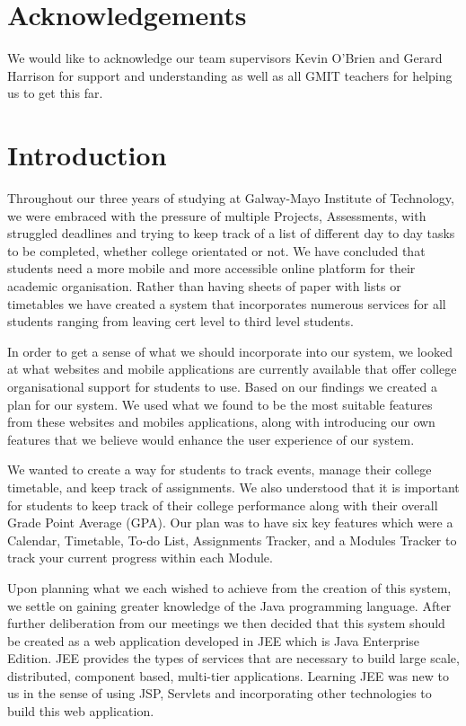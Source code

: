 \chapter*{Acknowledgements}
We would like to acknowledge our team supervisors Kevin O'Brien and Gerard Harrison for support and understanding as well as all GMIT teachers for helping us to get this far.

\chapter{Introduction}
\par Throughout our three years of studying at Galway-Mayo Institute of Technology, we were embraced with the pressure of multiple Projects, Assessments, with struggled deadlines and trying to keep track of a list of different day to day tasks to be completed, whether college orientated or not. We have concluded that students need a more mobile and more accessible online platform for their academic organisation. Rather than having sheets of paper with lists or timetables we have created a system that incorporates numerous services for all students ranging from leaving cert level to third level students.

\par In order to get a sense of what we should incorporate into our system, we looked at what websites and mobile applications are currently available that offer college organisational support for students to use. Based on our findings we created a plan for our system. We used what we found to be the most suitable features from these websites and mobiles applications, along with introducing our own features that we believe would enhance the user experience of our system.

\par We wanted to create a way for students to track events, manage their college timetable, and keep track of assignments. We also understood that it is important for students to keep track of their college performance along with their overall Grade Point Average (GPA). Our plan was to have six key features which were a Calendar, Timetable, To-do List, Assignments Tracker, and a Modules Tracker to track your current progress within each Module.

\par Upon planning what we each wished to achieve from the creation of this system, we settle on gaining greater knowledge of the Java programming language. After further deliberation from our meetings we then decided that this system should be created as a web application developed in JEE which is Java Enterprise Edition. JEE provides the types of services that are necessary to build large scale, distributed, component based, multi-tier applications. Learning JEE was new to us in the sense of using JSP, Servlets and incorporating other technologies to build this web application\cite{SimonBrown}.

